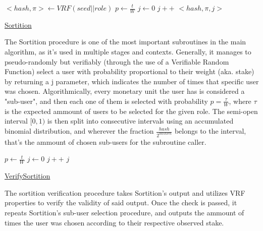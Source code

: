 \documentclass[10pt,a4paper]{article}
\begin{document}
\begin{algorithm}
    \begin{algorithmic}[H]
        \State $<hash, \pi> \gets VRF(seed||role)$
        \State $p \gets \frac{t}{W}$
        \State $j \gets 0$
        \While{$\frac{hash}{2^{hashlen}}$ \notin $[ \sum{}_{k=0}^{j}B(k;w,p), \sum{}_{k=0}^{j+1}B(k;w,p))$}
            \State $j++$
        \EndWhile
        \Return $<hash,\pi,j>$

    \end{algorithmic}
    \caption{\underline{Sortition}}
\end{algorithm}


The Sortition procedure is one of the most important subroutines in the main algorithm, as it's used in multiple stages and contexts.
Generally, it manages to pseudo-randomly but verifiably (through the use of a Verifiable Random Function) select a user with probability proportional
to their weight (aka. stake) by returning a j parameter, which indicates the number of times that specific user was chosen.
Algorithmically, every monetary unit the user has is considered a "sub-user", and then each one of them is selected with probability $p = \frac{\tau}{W}$,
where $\tau$ is the expected ammount of users to be selected for the given role.
The semi-open interval $[0,1)$ is then split into consecutive intervals using an accumulated binomial distribution, and wherever the fraction $\frac{hash}{2^{hashlen}}$
belongs to the interval, that's the ammount of chosen sub-users for the subroutine caller.


\begin{algorithm}
    \begin{algorithmic}[H]
        \State $p \gets \frac{t}{W}$
        \State $j \gets 0$
        \While{$\frac{hash}{2^{hashlen}}$ \notin $[ \sum{}_{k=0}^{j}B(k;w,p), \sum{}_{k=0}^{j+1}B(k;w,p))$}
            \State $j++$
        \EndWhile
        \Return $j$
    \end{algorithmic}
    \caption{\underline{VerifySortition}}
\end{algorithm}

The sortition verification procedure takes Sortition's output and utilizes VRF properties to verify the validity of said output.
Once the check is passed, it repeats Sortition's sub-user selection procedure, and outputs the ammount of times the user was chosen
according to their respective observed stake.
\end{document}
